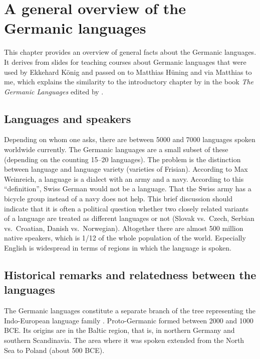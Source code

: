 \chapter{A general overview of the Germanic languages}

This chapter provides an overview of general facts about the Germanic languages. It derives from
slides for teaching courses about Germanic languages that were used by Ekkehard König and passed on
to Matthias Hüning and via Matthias to me, which explains the similarity to the introductory
chapter by \citet{HvDA94a} in the book \emph{The Germanic Languages} edited by \citet{KvdA94a-ed}.



\section{Languages and speakers}

Depending on whom one asks, there are between 5000 and 7000 languages spoken worldwide currently. The
Germanic languages are a small subset of these (depending on the counting 15--20 languages).
The problem is the distinction between language and language variety (\eg varieties of
Frisian). According to Max Weinreich, a language is a dialect with an army and a navy. According to
this ``definition'', Swiss German would not be a language. That the Swiss army has a bicycle group
instead of a navy does not help. This brief discussion should indicate that it is often a political
question whether two closely related variants of a language are treated as different languages or not (Slovak
vs.\ Czech, Serbian vs.\ Croatian, Danish vs.\ Norwegian).
Altogether there are almost 500 million native speakers, which is 1/12 of the whole population of
the world. Especially English is widespread in terms of regions in which the language is spoken.


\section{Historical remarks and relatedness between the languages}


The Germanic languages constitute a separate branch of the tree representing the Indo-European
language family \citep[]{Fitch2007a-u}.
Proto-Germanic formed between 2000 and
1000 BCE. Its origins are in the Baltic region, that is, in northern Germany and southern
Scandinavia. The area where it was spoken extended from the North Sea to Poland (about 500 BCE).


